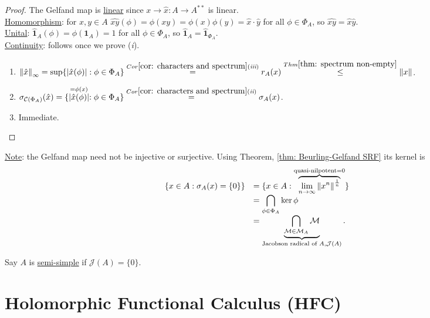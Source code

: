 \documentclass{article}
\begin{document}
\begin{proof}
    The Gelfand map is \noindent\underline{linear} since $x\to \hat{x}:A\to A^{**}$ is linear. \\

    \noindent\underline{Homomorphism}: for $x,y\in A$ $\widehat{xy}(\phi) = \phi(xy)=\phi(x)\phi(y)=\hat{x}\cdot\hat{y}$ for all $\phi\in \Phi_A$, so $\widehat{xy} = \hat{x}\hat{y}$.\\

    \noindent\underline{Unital}: $\hat{\mathbf{1}}_A(\phi)=\phi(\mathbf{1}_A)=1$ for all $\phi\in \Phi_A$, so $\hat{\mathbf{1}}_A = \hat{\mathbf{1}}_{\Phi_A}$.\\

    \noindent\underline{Continuity}: follows once we prove (\textit{i}).\\
    
    \begin{enumerate}[label = (\roman*), align = left]
        \item $\left\lVert\hat{x}\right\rVert_\infty = \sup \{|\hat{x}(\phi)|:\phi\in\Phi_A\} \stackrel{Cor \ref{cor: characters and spectrum} (\textit{iii})}{=} r_A(x) \stackrel{Thm \ref{thm: spectrum non-empty}}{\leq }  \left\lVert x\right\rVert$.
        \item $\sigma_{\mathcal{C}(\Phi_A)}(\hat{x})=\{\stackrel{=\phi(x)}{|\hat{x}(\phi)|}:\phi\in\Phi_A\} \stackrel{Cor \ref{cor: characters and spectrum} (\textit{ii})}{=}  \sigma_A(x)$.
        \item Immediate.
    \end{enumerate}
\end{proof}

\noindent\underline{Note}: the Gelfand map need not be injective or surjective. Using Theorem, \ref{thm: Beurling-Gelfand SRF} its kernel is 
$$
\begin{array}{ll}
    \{x\in A: \sigma_A(x) = \{0\}\} &=\{x\in A: \overbrace{{\displaystyle\lim_{n\to \infty}\norm{x^n}^{\frac{1}{n}}}}^{\text{quasi-nilpotent} = 0}\}\\
    &= \displaystyle\bigcap_{\phi\in\Phi_A}\ker\phi\\
    &=\noindent\underbrace{\displaystyle\bigcap_{\mathcal{M}\in\mathcal{M}_A}\mathcal{M}}_{\text{Jacobson radical of }A, \mathcal{J}(A)}.
\end{array}
$$

Say $A$ is \noindent\underline{semi-simple} if $\mathcal{J}(A)=\{0\}$.

\section{Holomorphic Functional Calculus (HFC)}
\end{document}
